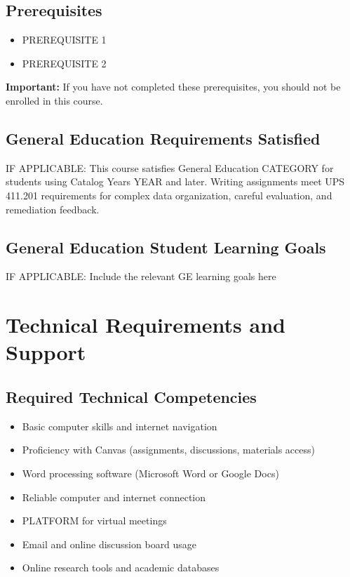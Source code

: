 \documentclass[11pt]{scrartcl} %
\begin{document}
\subsection{Prerequisites}
\begin{itemize}
\item PREREQUISITE 1
\item PREREQUISITE 2
\end{itemize}

\textbf{Important:} If you have not completed these prerequisites, you should not be enrolled in this course.

\subsection{General Education Requirements Satisfied}
IF APPLICABLE: This course satisfies General Education CATEGORY for students using Catalog Years YEAR and later. Writing assignments meet UPS 411.201 requirements for complex data organization, careful evaluation, and remediation feedback.

\subsection{General Education Student Learning Goals}
IF APPLICABLE: Include the relevant GE learning goals here

\section{Technical Requirements and Support}

\subsection{Required Technical Competencies}
\begin{itemize}
\item Basic computer skills and internet navigation
\item Proficiency with Canvas (assignments, discussions, materials access)
\item Word processing software (Microsoft Word or Google Docs)
\item Reliable computer and internet connection
\item PLATFORM for virtual meetings
\item Email and online discussion board usage
\item Online research tools and academic databases
\end{itemize}
\end{document}
